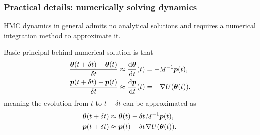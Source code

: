 \documentclass[18pt]{beamer}
\newcommand{\diff}{\operatorname{\mathrm{d}}\!{}}
\newcommand{\thinnerspace}{\mskip.5\thinmuskip}
\newcommand{\momentum}{p}
\newcommand{\bmomentum}{\bm{\momentum}}
\newcommand{\mass}{\scalebox{.85}{$M$}}
\newcommand{\potential}{U}
\newcommand{\bparam}{\bm{\theta}}
\newcommand{\Hmc}{H{\small MC}}
\begin{document}
\newcommand{\bposition}{\bparam}
\newcommand{\stepsize}{\delta t}
\newcommand{\numIntegStep}{L}
\renewcommand{\frametitleText}{Practical details: numerically solving dynamics}
\begin{frame}
\frametitle{\frametitleText}

\Hmc{} dynamics in general admits no analytical solutions and requires a numerical integration method to approximate it.

\pause%
\smallskip
Basic principal behind numerical solution is that
\begin{equation*}
\setlength{\abovedisplayskip}{.5\baselineskip}%
\setlength{\belowdisplayskip}{.5\baselineskip}%
\begin{aligned}
\frac{\bposition (t + \stepsize) - \bposition(t)}{\stepsize}
	&\approx \frac{\diff \bposition}{\diff t}(t) 
	= - \mass^{-1} \bmomentum(t),\\
\frac{\bmomentum (t + \stepsize) - \bmomentum(t)}{\stepsize}
	&\approx \frac{\diff \bmomentum}{\diff t}(t) 
	= - \nabla \potential(\bposition(t)),
\end{aligned}
\end{equation*}
\pause%
meaning the evolution from $t$ to $t + \stepsize$ can be approximated as
\begin{equation*}
\setlength{\abovedisplayskip}{.5\baselineskip}%
\begin{aligned}
\bposition (t + \stepsize)
	&\approx \bposition(t) - \stepsize \thinnerspace  \mass^{-1} \bmomentum(t),\\
\bmomentum (t + \stepsize) 
	&\approx \bmomentum(t) - \stepsize \thinnerspace \nabla \potential(\bposition(t)).
\end{aligned}
\end{equation*}
 
\end{frame}
 
\end{document}
